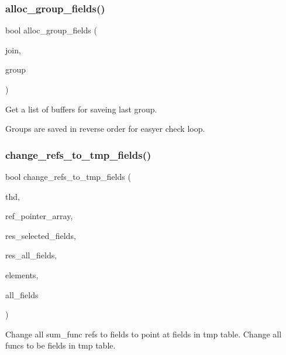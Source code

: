 \subsubsection{\texorpdfstring{alloc\+\_\+group\+\_\+fields()}{alloc\_group\_fields()}}
{\footnotesize\ttfamily bool alloc\+\_\+group\+\_\+fields (\begin{DoxyParamCaption}\item[{\mbox{\hyperlink{classJOIN}{J\+O\+IN}} $\ast$}]{join,  }\item[{\mbox{\hyperlink{structst__order}{O\+R\+D\+ER}} $\ast$}]{group }\end{DoxyParamCaption})}

Get a list of buffers for saveing last group.

Groups are saved in reverse order for easyer check loop. \mbox{\label{group__Query__Executor_gae27d7837289ad61f55a8649b343d2ffe}} 
\subsubsection{\texorpdfstring{change\+\_\+refs\+\_\+to\+\_\+tmp\+\_\+fields()}{change\_refs\_to\_tmp\_fields()}}
{\footnotesize\ttfamily bool change\+\_\+refs\+\_\+to\+\_\+tmp\+\_\+fields (\begin{DoxyParamCaption}\item[{T\+HD $\ast$}]{thd,  }\item[{\mbox{\hyperlink{classBounds__checked__array}{Ref\+\_\+ptr\+\_\+array}}}]{ref\+\_\+pointer\+\_\+array,  }\item[{\mbox{\hyperlink{classList}{List}}$<$ \mbox{\hyperlink{classItem}{Item}} $>$ \&}]{res\+\_\+selected\+\_\+fields,  }\item[{\mbox{\hyperlink{classList}{List}}$<$ \mbox{\hyperlink{classItem}{Item}} $>$ \&}]{res\+\_\+all\+\_\+fields,  }\item[{uint}]{elements,  }\item[{\mbox{\hyperlink{classList}{List}}$<$ \mbox{\hyperlink{classItem}{Item}} $>$ \&}]{all\+\_\+fields }\end{DoxyParamCaption})}

Change all sum\+\_\+func refs to fields to point at fields in tmp table. Change all funcs to be fields in tmp table.


